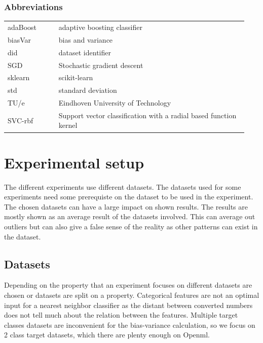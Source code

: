 \documentclass[a4paper,10pt]{article}
\begin{document}
\subsubsection{Abbreviations}
\begin{tabular}{ p{0.20\linewidth} p{0.7437\linewidth} }
	
	adaBoost & adaptive boosting classifier \\
	
	biasVar & bias and variance \\
	
	did & dataset identifier \\
	
	SGD & Stochastic gradient descent \\
	
	sklearn & scikit-learn \\
	
	std & standard deviation\\
	
	TU/e & Eindhoven University of Technology \\
	
	SVC-rbf & Support vector classification with a radial based function kernel
	
	
\end{tabular}

\newpage
\section{Experimental setup} \label{Chapter3}
The different experiments use different datasets. The datasets used for some experiments need some prerequiste on the dataset to be used in the experiment. The chosen datasets can have a large impact on shown results.
The results are mostly shown as an average result of the datasets involved. This can average out outliers but can also give a false sense of the reality as other patterns can exist in the dataset.


\subsection{Datasets} \label{description}
Depending on the property that an experiment focuses on different datasets are chosen or datasets are split on a property. Categorical features are not an optimal input for a nearest neighbor classifier as the distant between converted numbers does not tell much about the relation between the features. Multiple target classes datasets are inconvenient for the bias-variance calculation, so we focus on 2 class target datasets, which there are plenty enough on Openml. 
\end{document}
